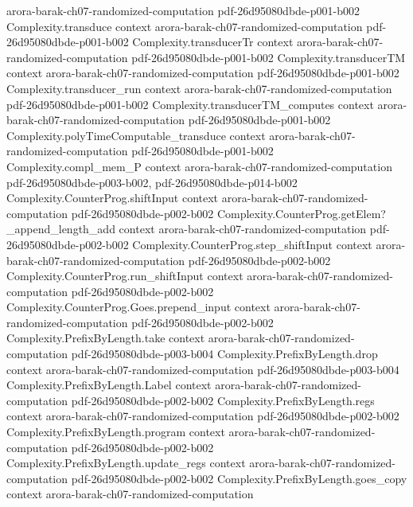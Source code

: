 \begin{theorem}
  {arora-barak-ch07-randomized-computation}
  {pdf-26d95080dbde-p001-b002}
\proofstep
  {Complexity.transduce}
  {context}
  {arora-barak-ch07-randomized-computation}
  {pdf-26d95080dbde-p001-b002}
\proofstep
  {Complexity.transducerTr}
  {context}
  {arora-barak-ch07-randomized-computation}
  {pdf-26d95080dbde-p001-b002}
\proofstep
  {Complexity.transducerTM}
  {context}
  {arora-barak-ch07-randomized-computation}
  {pdf-26d95080dbde-p001-b002}
\proofstep
  {Complexity.transducer_run}
  {context}
  {arora-barak-ch07-randomized-computation}
  {pdf-26d95080dbde-p001-b002}
\proofstep
  {Complexity.transducerTM_computes}
  {context}
  {arora-barak-ch07-randomized-computation}
  {pdf-26d95080dbde-p001-b002}
\proofstep
  {Complexity.polyTimeComputable_transduce}
  {context}
  {arora-barak-ch07-randomized-computation}
  {pdf-26d95080dbde-p001-b002}
\proofstep
  {Complexity.compl_mem_P}
  {context}
  {arora-barak-ch07-randomized-computation}
  {pdf-26d95080dbde-p003-b002,
    pdf-26d95080dbde-p014-b002}
\proofstep
  {Complexity.CounterProg.shiftInput}
  {context}
  {arora-barak-ch07-randomized-computation}
  {pdf-26d95080dbde-p002-b002}
\proofstep
  {Complexity.CounterProg.getElem?_append_length_add}
  {context}
  {arora-barak-ch07-randomized-computation}
  {pdf-26d95080dbde-p002-b002}
\proofstep
  {Complexity.CounterProg.step_shiftInput}
  {context}
  {arora-barak-ch07-randomized-computation}
  {pdf-26d95080dbde-p002-b002}
\proofstep
  {Complexity.CounterProg.run_shiftInput}
  {context}
  {arora-barak-ch07-randomized-computation}
  {pdf-26d95080dbde-p002-b002}
\proofstep
  {Complexity.CounterProg.Goes.prepend_input}
  {context}
  {arora-barak-ch07-randomized-computation}
  {pdf-26d95080dbde-p002-b002}
\proofstep
  {Complexity.PrefixByLength.take}
  {context}
  {arora-barak-ch07-randomized-computation}
  {pdf-26d95080dbde-p003-b004}
\proofstep
  {Complexity.PrefixByLength.drop}
  {context}
  {arora-barak-ch07-randomized-computation}
  {pdf-26d95080dbde-p003-b004}
\proofstep
  {Complexity.PrefixByLength.Label}
  {context}
  {arora-barak-ch07-randomized-computation}
  {pdf-26d95080dbde-p002-b002}
\proofstep
  {Complexity.PrefixByLength.regs}
  {context}
  {arora-barak-ch07-randomized-computation}
  {pdf-26d95080dbde-p002-b002}
\proofstep
  {Complexity.PrefixByLength.program}
  {context}
  {arora-barak-ch07-randomized-computation}
  {pdf-26d95080dbde-p002-b002}
\proofstep
  {Complexity.PrefixByLength.update_regs}
  {context}
  {arora-barak-ch07-randomized-computation}
  {pdf-26d95080dbde-p002-b002}
\proofstep
  {Complexity.PrefixByLength.goes_copy}
  {context}
  {arora-barak-ch07-randomized-computation}

\end{theorem}
